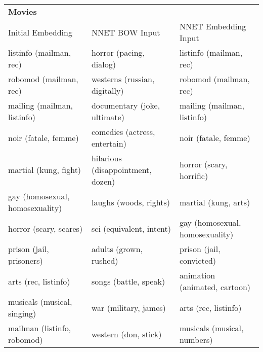 \begin{table}[]
	\scriptsize
	\begin{tabular}{lll}
		\textbf{Movies}                                   &                                                   &                                                          \\
		Initial Embedding                                  & NNET BOW Input                                       & NNET Embedding Input                                             \\
		\toprule
		listinfo (mailman, rec)                  & horror (pacing, dialog)                           & listinfo (mailman, rec)                                  \\
		robomod (mailman, rec)                   & westerns (russian, digitally)                     & robomod (mailman, rec)                                   \\
		mailing (mailman, listinfo)              & documentary (joke, ultimate)                      & mailing (mailman, listinfo)                              \\
		noir (fatale, femme)                     & comedies (actress, entertain)                     & noir (fatale, femme)                                     \\
		martial (kung, fight)                    & hilarious (disappointment, dozen)                 & horror (scary, horrific)                                 \\
		gay (homosexual, homosexuality)          & laughs (woods, rights)                            & martial (kung, arts)                                     \\
		horror (scary, scares)                   & sci (equivalent, intent)                          & gay (homosexual, homosexuality)                          \\
		prison (jail, prisoners)                 & adults (grown, rushed)                            & prison (jail, convicted)                                 \\
		arts (rec, listinfo)                     & songs (battle, speak)                             & animation (animated, cartoon)                            \\
		musicals (musical, singing)              & war (military, james)                             & arts (rec, listinfo)                                     \\
		mailman (listinfo, robomod)              & western (don, stick)                              & musicals (musical, numbers)                              \\

\end{tabular}
\end{table}
